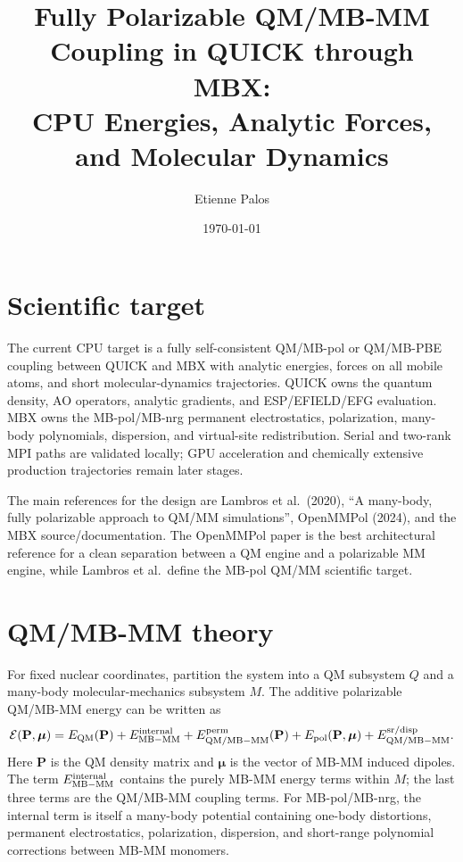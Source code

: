 \documentclass[11pt]{article}
\title{Fully Polarizable QM/MB-MM Coupling in QUICK through MBX:\\
CPU Energies, Analytic Forces, and Molecular Dynamics}
\author{Etienne Palos}
\date{\today}
\begin{document}
\maketitle

\section{Scientific target}

The current CPU target is a fully self-consistent QM/MB-pol or QM/MB-PBE
coupling between QUICK and MBX with analytic energies, forces on all
mobile atoms, and short molecular-dynamics trajectories. QUICK owns the
quantum density, AO operators, analytic gradients, and ESP/EFIELD/EFG
evaluation. MBX owns the MB-pol/MB-nrg permanent electrostatics,
polarization, many-body polynomials, dispersion, and virtual-site
redistribution. Serial and two-rank MPI paths are validated locally; GPU
acceleration and chemically extensive production trajectories remain
later stages.

The main references for the design are Lambros et al.\ (2020), ``A
many-body, fully polarizable approach to QM/MM simulations'', OpenMMPol
(2024), and the MBX source/documentation. The OpenMMPol paper is the best
architectural reference for a clean separation between a QM engine and a
polarizable MM engine, while Lambros et al.\ define the MB-pol QM/MM
scientific target.

\section{QM/MB-MM theory}

For fixed nuclear coordinates, partition the system into a QM subsystem
$Q$ and a many-body molecular-mechanics subsystem $M$. The additive
polarizable QM/MB-MM energy can be written as
\begin{equation}
  \mathcal{E}(\mathbf{P},\boldsymbol{\mu})
  =
  E_{\rm QM}(\mathbf{P})
  + E_{\rm MB-MM}^{\rm internal}
  + E_{\rm QM/MB-MM}^{\rm perm}(\mathbf{P})
  + E_{\rm pol}(\mathbf{P},\boldsymbol{\mu})
  + E_{\rm QM/MB-MM}^{\rm sr/disp}.
  \label{eq:qmmm_total_functional}
\end{equation}
Here $\mathbf{P}$ is the QM density matrix and $\boldsymbol{\mu}$ is the
vector of MB-MM induced dipoles. The term
$E_{\rm MB-MM}^{\rm internal}$ contains the purely MB-MM energy terms
within $M$; the last three terms are the QM/MB-MM coupling terms. For
MB-pol/MB-nrg, the internal term is itself a many-body potential containing
one-body distortions, permanent electrostatics, polarization, dispersion,
and short-range polynomial corrections between MB-MM monomers.
\end{document}

